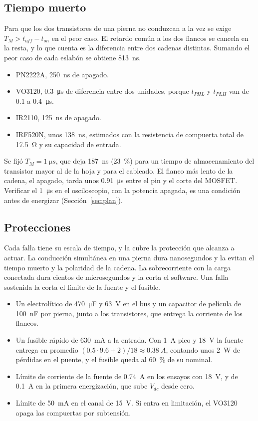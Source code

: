 \documentclass[journal]{IEEEtran}
\begin{document}
\subsection{Tiempo muerto}
\label{sec:tm}
Para que los dos transistores de una pierna no conduzcan a la vez se exige $T_M>t_{off}-t_{on}$ en el peor caso. El retardo común a los dos flancos se cancela en la resta, y lo que cuenta es la diferencia entre dos cadenas distintas. Sumando el peor caso de cada eslabón se obtiene \SI{813}{ns}.

\begin{itemize}
	\item PN2222A, \SI{250}{ns} de apagado.
	\item VO3120, \SI{0.3}{\micro s} de diferencia entre dos unidades, porque $t_{PHL}$ y $t_{PLH}$ van de \num{0.1} a \SI{0.4}{\micro s}.
	\item IR2110, \SI{125}{ns} de apagado.
	\item IRF520N, unos \SI{138}{ns}, estimados con la resistencia de compuerta total de \SI{17.5}{\ohm} y su capacidad de entrada.
\end{itemize}

Se fijó $T_M=\SI{1}{\micro s}$, que deja \SI{187}{ns} (\SI{23}{\percent}) para un tiempo de almacenamiento del transistor mayor al de la hoja y para el cableado. El flanco más lento de la cadena, el apagado, tarda unos \SI{0.91}{\micro s} entre el pin y el corte del MOSFET. Verificar el \SI{1}{\micro s} en el osciloscopio, con la potencia apagada, es una condición antes de energizar (Sección~\ref{sec:plan}).

\subsection{Protecciones}
\label{sec:prot}
Cada falla tiene su escala de tiempo, y la cubre la protección que alcanza a actuar. La conducción simultánea en una pierna dura nanosegundos y la evitan el tiempo muerto y la polaridad de la cadena. La sobrecorriente con la carga conectada dura cientos de microsegundos y la corta el software. Una falla sostenida la corta el límite de la fuente y el fusible.

\begin{itemize}
	\item Un electrolítico de \SI{470}{\micro F} y \SI{63}{V} en el bus y un capacitor de película de \SI{100}{nF} por pierna, junto a los transistores, que entrega la corriente de los flancos.
	\item Un fusible rápido de \SI{630}{mA} a la entrada. Con \SI{1}{A} pico y \SI{18}{V} la fuente entrega en promedio $(0.5\cdot9.6+2)/18\approx\SI{0.38}{A}$, contando unos \SI{2}{W} de pérdidas en el puente, y el fusible queda al \SI{60}{\percent} de su nominal.
	\item Límite de corriente de la fuente de \SI{0.74}{A} en los ensayos con \SI{18}{V}, y de \SI{0.1}{A} en la primera energización, que sube $V_{dc}$ desde cero.
	\item Límite de \SI{50}{mA} en el canal de \SI{15}{V}. Si entra en limitación, el VO3120 apaga las compuertas por subtensión.
\end{itemize}
\end{document}
